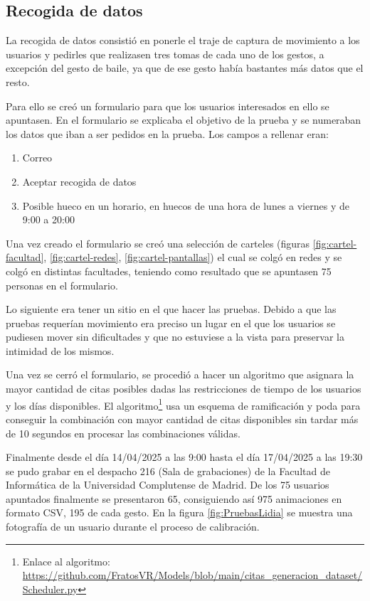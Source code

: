 \subsection{Recogida de datos}
La recogida de datos consistió en ponerle el traje de captura de movimiento a los usuarios y pedirles que realizasen tres tomas de cada uno de los gestos, a excepción del gesto de baile, ya que de ese gesto había bastantes más datos que el resto.

Para ello se creó un formulario para que los usuarios interesados en ello se apuntasen. En el formulario se explicaba el objetivo de la prueba y se numeraban los datos que iban a ser pedidos en la prueba. Los campos a rellenar eran:

\begin{enumerate}
	\item Correo
	\item Aceptar recogida de datos
	\item Posible hueco en un horario, en huecos de una hora de lunes a viernes y de 9:00 a 20:00
\end{enumerate}

Una vez creado el formulario se creó una selección de carteles (figuras \ref{fig:cartel-facultad}, \ref{fig:cartel-redes}, \ref{fig:cartel-pantallas}) el cual se colgó en redes y se colgó en distintas facultades, teniendo como resultado que se apuntasen 75 personas en el formulario.

Lo siguiente era tener un sitio en el que hacer las pruebas. Debido a que las pruebas requerían movimiento era preciso un lugar en el que los usuarios se pudiesen mover sin dificultades y que no estuviese a la vista para preservar la intimidad de los mismos.

Una vez se cerró el formulario, se procedió a hacer un algoritmo que asignara la mayor cantidad de citas posibles dadas las restricciones de tiempo de los usuarios y los días disponibles. El algoritmo\footnote{Enlace al algoritmo: \url{https://github.com/FratosVR/Models/blob/main/citas_generacion_dataset/Scheduler.py}} usa un esquema de ramificación y poda para conseguir la combinación con mayor cantidad de citas disponibles sin tardar más de 10 segundos en procesar las combinaciones válidas.

Finalmente desde el día 14/04/2025 a las 9:00 hasta el día 17/04/2025 a las 19:30 se pudo grabar en el despacho 216 (Sala de grabaciones) de la Facultad de Informática de la Universidad Complutense de Madrid.
De los 75 usuarios apuntados finalmente se presentaron 65, consiguiendo así 975 animaciones en formato CSV, 195 de cada gesto. En la figura \ref{fig:PruebasLidia} se muestra una fotografía de un usuario durante el proceso de calibración.

